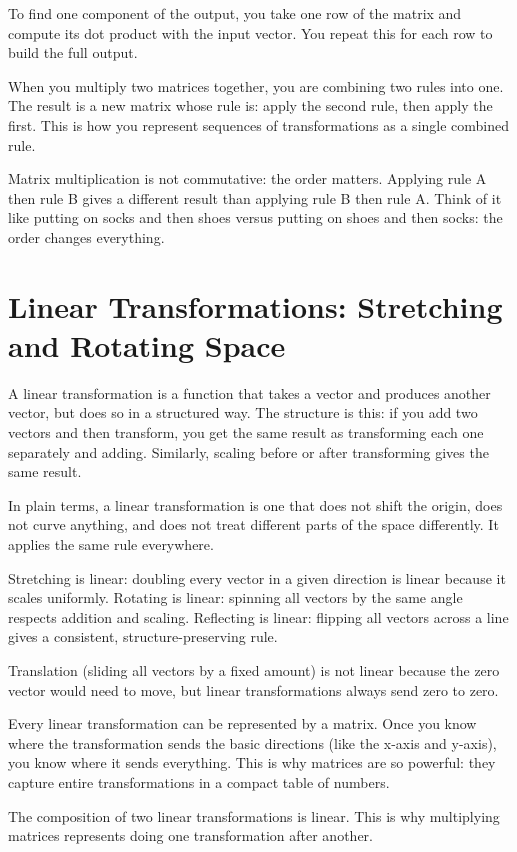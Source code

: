 \documentclass[11pt]{article}
\begin{document}
To find one component of the output, you take one row of the matrix and compute its dot product with the input vector. You repeat this for each row to build the full output.

When you multiply two matrices together, you are combining two rules into one. The result is a new matrix whose rule is: apply the second rule, then apply the first. This is how you represent sequences of transformations as a single combined rule.

Matrix multiplication is not commutative: the order matters. Applying rule A then rule B gives a different result than applying rule B then rule A. Think of it like putting on socks and then shoes versus putting on shoes and then socks: the order changes everything.

\section*{Linear Transformations: Stretching and Rotating Space}

A linear transformation is a function that takes a vector and produces another vector, but does so in a structured way. The structure is this: if you add two vectors and then transform, you get the same result as transforming each one separately and adding. Similarly, scaling before or after transforming gives the same result.

In plain terms, a linear transformation is one that does not shift the origin, does not curve anything, and does not treat different parts of the space differently. It applies the same rule everywhere.

Stretching is linear: doubling every vector in a given direction is linear because it scales uniformly. Rotating is linear: spinning all vectors by the same angle respects addition and scaling. Reflecting is linear: flipping all vectors across a line gives a consistent, structure-preserving rule.

Translation (sliding all vectors by a fixed amount) is not linear because the zero vector would need to move, but linear transformations always send zero to zero.

Every linear transformation can be represented by a matrix. Once you know where the transformation sends the basic directions (like the x-axis and y-axis), you know where it sends everything. This is why matrices are so powerful: they capture entire transformations in a compact table of numbers.

The composition of two linear transformations is linear. This is why multiplying matrices represents doing one transformation after another.
\end{document}
